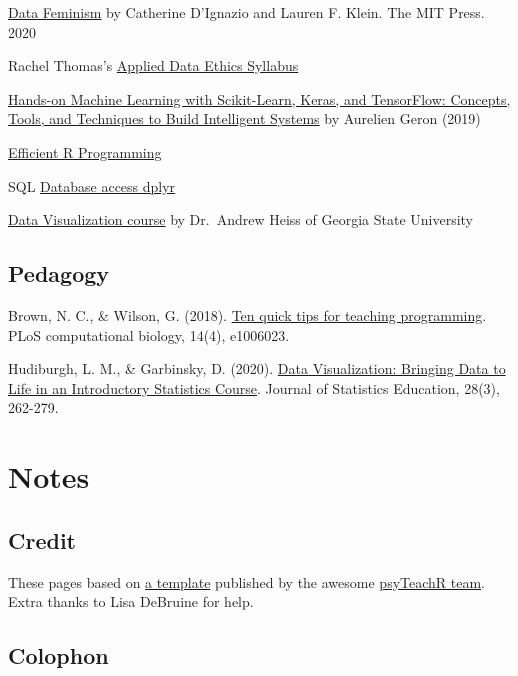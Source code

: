 \documentclass[
]{book}
\begin{document}
\href{https://data-feminism.mitpress.mit.edu/}{Data Feminism} by Catherine D'Ignazio and Lauren F. Klein. The MIT Press. 2020

Rachel Thomas's \href{https://ethics.fast.ai/syllabus}{Applied Data Ethics Syllabus}

\href{https://www.amazon.co.uk/Hands-Machine-Learning-Scikit-Learn-TensorFlow/dp/1492032646}{Hands-on Machine Learning with Scikit-Learn, Keras, and TensorFlow: Concepts, Tools, and Techniques to Build Intelligent Systems} by Aurelien Geron (2019)

\href{https://csgillespie.github.io/efficientR/}{Efficient R Programming}

SQL \href{https://db.rstudio.com/dplyr/}{Database access dplyr}

\href{https://datavizm20.classes.andrewheiss.com/lesson/}{Data Visualization course} by Dr.~Andrew Heiss of Georgia State University

\hypertarget{pedagogy}{%
\section{Pedagogy}\label{pedagogy}}

Brown, N. C., \& Wilson, G. (2018). \href{https://journals.plos.org/ploscompbiol/article?id=10.1371/journal.pcbi.1006023}{Ten quick tips for teaching programming}. PLoS computational biology, 14(4), e1006023.

Hudiburgh, L. M., \& Garbinsky, D. (2020). \href{https://www.tandfonline.com/doi/full/10.1080/10691898.2020.1796399}{Data Visualization: Bringing Data to Life in an Introductory Statistics Course}. Journal of Statistics Education, 28(3), 262-279.

\hypertarget{notes}{%
\chapter{Notes}\label{notes}}

\hypertarget{credit}{%
\section{Credit}\label{credit}}

These pages based on \href{https://psyteachr.github.io/book-template/}{a template} published by the awesome \href{https://psyteachr.github.io/about/}{psyTeachR team}. Extra thanks to Lisa DeBruine for help.

\hypertarget{colophon}{%
\section{Colophon}\label{colophon}}
\end{document}
